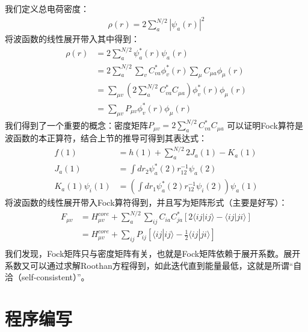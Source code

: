 \documentclass[12pt, a4paper, oneside]{ctexart}
\begin{document}
我们定义总电荷密度：
\begin{equation}
\begin{aligned}
\rho(r)=2\sum_a^{N/2}|\psi_a(r)|^2
\end{aligned}
\end{equation}
将波函数的线性展开带入其中得到：
\begin{equation}
\begin{aligned}
\rho(r)&=2\sum_a^{N/2}\psi_a^*(r)\psi_a(r)\\
&=2\sum_a^{N/2}\sum_vC_{va}^*\phi_v^*(r)\sum_{\mu}C_{\mu a}\phi_{\mu}(r)\\
&=\sum_{\mu v}\left(2\sum_a^{N/2}C_{va}^*C_{\mu a}\right)\phi_v^*(r)\phi_{\mu}(r)\\
&=\sum_{\mu v}P_{\mu v}\phi_v^*(r)\phi_{\mu}(r)
\end{aligned}
\end{equation}
我们得到了一个重要的概念：密度矩阵$P_{\mu v}=2\sum_a^{N/2}C_{va}^*C_{\mu a}$
可以证明Fock算符是波函数的本正算符，结合上节的推导可得到其表达式：
\begin{equation}
\begin{aligned}
f(1)&=h(1)+\sum_{a}^{N/2}2J_{a}(1)-K_{a}(1)\\
J_a(1)&=\int dr_2\psi_a^*(2)r_{12}^{-1}\psi_a(2)\\
K_a(1)\psi_i(1)&=\left(\int dr_1\psi_a^*(2)r_{12}^{-1}\psi_i(2)\right)\psi_a(1)
\end{aligned}
\end{equation}
将波函数的线性展开带入Fock算符得到，并且写为矩阵形式（主要是好写）：
\begin{equation}
\begin{aligned}
F_{\mu v}&=H_{\mu v}^{core}+\sum_a^{N/2}\sum_{ij}C_{ia}C_{ja}^*[2\langle ij|ij\rangle-\langle ij|ji\rangle]\\
&=H_{\mu v}^{core}+\sum_{ij}P_{ij}[\langle ij|ij\rangle-\frac12\langle ij|ji\rangle]\\
\end{aligned}
\end{equation}
我们发现，Fock矩阵只与密度矩阵有关，也就是Fock矩阵依赖于展开系数。展开系数又可以通过求解Roothan方程得到，如此迭代直到能量最低，这就是所谓“自洽（self-consistent）”。

\newpage

\section{程序编写}
\end{document}
